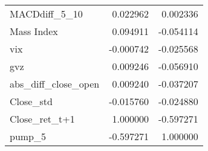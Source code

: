 \begin{tabular}{lrr}
MACDdiff\_5\_10             &       0.022962 &  0.002336 \\
Mass Index                &       0.094911 & -0.054114 \\
vix                       &      -0.000742 & -0.025568 \\
gvz                       &       0.009246 & -0.056910 \\
abs\_diff\_close\_open       &       0.009240 & -0.037207 \\
Close\_std                 &      -0.015760 & -0.024880 \\
Close\_ret\_t+1             &       1.000000 & -0.597271 \\
pump\_5                    &      -0.597271 &  1.000000 \\
\bottomrule
\end{tabular}
